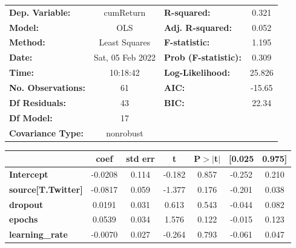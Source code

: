 \begin{center}
\begin{tabular}{lclc}
\toprule
\textbf{Dep. Variable:}                   &    cumReturn     & \textbf{  R-squared:         } &     0.321   \\
\textbf{Model:}                           &       OLS        & \textbf{  Adj. R-squared:    } &     0.052   \\
\textbf{Method:}                          &  Least Squares   & \textbf{  F-statistic:       } &     1.195   \\
\textbf{Date:}                            & Sat, 05 Feb 2022 & \textbf{  Prob (F-statistic):} &    0.309    \\
\textbf{Time:}                            &     10:18:42     & \textbf{  Log-Likelihood:    } &    25.826   \\
\textbf{No. Observations:}                &          61      & \textbf{  AIC:               } &    -15.65   \\
\textbf{Df Residuals:}                    &          43      & \textbf{  BIC:               } &     22.34   \\
\textbf{Df Model:}                        &          17      & \textbf{                     } &             \\
\textbf{Covariance Type:}                 &    nonrobust     & \textbf{                     } &             \\
\bottomrule
\end{tabular}
\begin{tabular}{lcccccc}
                                          & \textbf{coef} & \textbf{std err} & \textbf{t} & \textbf{P$> |$t$|$} & \textbf{[0.025} & \textbf{0.975]}  \\
\midrule
\textbf{Intercept}                        &      -0.0208  &        0.114     &    -0.182  &         0.857        &       -0.252    &        0.210     \\
\textbf{source[T.Twitter]}                &      -0.0817  &        0.059     &    -1.377  &         0.176        &       -0.201    &        0.038     \\
\textbf{dropout}                          &       0.0191  &        0.031     &     0.613  &         0.543        &       -0.044    &        0.082     \\
\textbf{epochs}                           &       0.0539  &        0.034     &     1.576  &         0.122        &       -0.015    &        0.123     \\
\textbf{learning\_rate}                   &      -0.0070  &        0.027     &    -0.264  &         0.793        &       -0.061    &        0.047     \\

\end{tabular}
\end{center}
